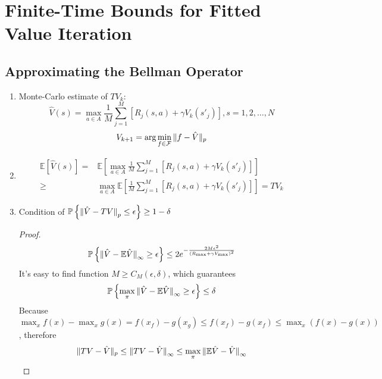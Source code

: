 \documentclass[a4paper]{article}
\begin{document}
\section{Finite-Time Bounds for Fitted Value Iteration}%

\subsection{Approximating the Bellman Operator}%

\begin{enumerate}
    \item Monte-Carlo estimate of $ TV_k $:
        \[
             \hat V(s) = \max_{a \in A} \frac{1}{M} \sum^{M}_{j=1} \left[ R_j(s, a) + \gamma V_k(s'_j) \right], s = 1, 2, \ldots, N
        \]
        \[
            V_{k+1} = \arg\min_{f \in \mathcal{F}} \Arrowvert f - \hat V \Arrowvert_p
        \]
    \item 
        \begin{align*}
            \mathbb{E}\left[ \hat V(s) \right] =& \mathbb{E}\left[ \max_{a \in A} \frac{1}{M} \sum^{M}_{j=1} \left[ R_j(s, a) + \gamma V_k(s'_j) \right] \right] \\
            \ge& \max_{a \in A} \mathbb{E} \left[ \frac{1}{M} \sum^{M}_{j=1} \left[ R_j(s,a) + \gamma V_k(s'_j) \right] \right] = TV_k
        \end{align*}
    \item Condition of $ \mathbb{P} \left\{ {\Arrowvert \hat V - TV \Arrowvert}_p \le \epsilon\right\} \ge 1 - \delta $
        \begin{proof}
            \begin{align*}
                \mathbb{P} \left\{ {\Arrowvert \hat V - \mathbb{E}\hat V \Arrowvert}_\infty \ge \epsilon \right\}
                \le 2 e^{-\frac{2M \epsilon^2}{{(R_{\max} + \gamma V_{\max})}^2} }
            \end{align*}
            It's easy to find function $ M \ge C_M(\epsilon, \delta) $, which guarantees
            \[
                 \mathbb{P} \left\{ \max_{\pi}{\Arrowvert \hat V - \mathbb{E} \hat V \Arrowvert}_\infty \ge \epsilon \right\} \le \delta
            \]
            Because $ \max_x f(x) - \max_x g(x) = f(x_f) - g(x_g) \le f(x_f) - g(x_f) \le \max_x (f(x) - g(x)) $,
            therefore
            \[
                \Arrowvert TV - \hat V \Arrowvert_p \le {\Arrowvert TV - \hat V \Arrowvert}_\infty \le \max_{\pi} {\Arrowvert \mathbb{E}\hat V - \hat V \Arrowvert}_\infty
            \]
        \end{proof}

\end{enumerate}
\end{document}
